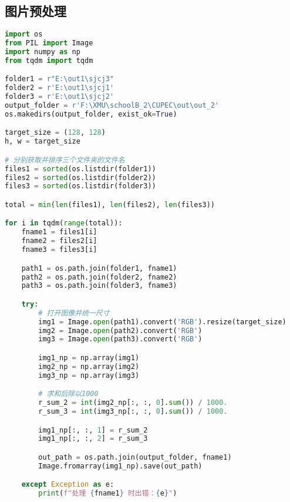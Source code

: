 \documentclass{report}
\begin{document}
\subsection{图片预处理}
\begin{lstlisting}[language=Python, caption=图片处理, label=code:discriminator]
import os
from PIL import Image
import numpy as np
from tqdm import tqdm

folder1 = r"E:\out1\sjcj3"
folder2 = r'E:\out1\sjcj1'
folder3 = r'E:\out1\sjcj2'
output_folder = r'F:\XMU\schoolB_2\CUPEC\out\out_2'
os.makedirs(output_folder, exist_ok=True)

target_size = (128, 128)
h, w = target_size

# 分别获取并排序三个文件夹的文件名
files1 = sorted(os.listdir(folder1))
files2 = sorted(os.listdir(folder2))
files3 = sorted(os.listdir(folder3))

total = min(len(files1), len(files2), len(files3))

for i in tqdm(range(total)):
    fname1 = files1[i]
    fname2 = files2[i]
    fname3 = files3[i]

    path1 = os.path.join(folder1, fname1)
    path2 = os.path.join(folder2, fname2)
    path3 = os.path.join(folder3, fname3)

    try:
        # 打开图像并统一尺寸
        img1 = Image.open(path1).convert('RGB').resize(target_size)
        img2 = Image.open(path2).convert('RGB')
        img3 = Image.open(path3).convert('RGB')

        img1_np = np.array(img1)
        img2_np = np.array(img2)
        img3_np = np.array(img3)

        # 求和后除以1000
        r_sum_2 = int(img2_np[:, :, 0].sum()) / 1000.
        r_sum_3 = int(img3_np[:, :, 0].sum()) / 1000.

        img1_np[:, :, 1] = r_sum_2
        img1_np[:, :, 2] = r_sum_3

        out_path = os.path.join(output_folder, fname1)
        Image.fromarray(img1_np).save(out_path)

    except Exception as e:
        print(f"处理 {fname1} 时出错：{e}")
\end{lstlisting}
\end{document}
